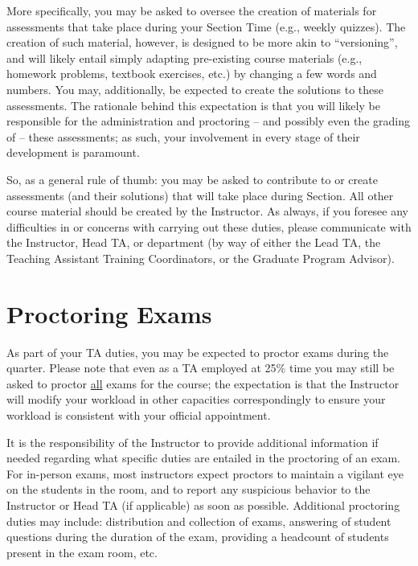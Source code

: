 \documentclass[
  letterpaper,
  DIV=11,
  numbers=noendperiod]{scrreprt}
\begin{document}
More specifically, you may be asked to oversee the creation of materials
for assessments that take place during your Section Time (e.g., weekly
quizzes). The creation of such material, however, is designed to be more
akin to ``versioning'', and will likely entail simply adapting
pre-existing course materials (e.g., homework problems, textbook
exercises, etc.) by changing a few words and numbers. You may,
additionally, be expected to create the solutions to these assessments.
The rationale behind this expectation is that you will likely be
responsible for the administration and proctoring -- and possibly even
the grading of -- these assessments; as such, your involvement in every
stage of their development is paramount.

So, as a general rule of thumb: you may be asked to contribute to or
create assessments (and their solutions) that will take place during
Section. All other course material should be created by the Instructor.
As always, if you foresee any difficulties in or concerns with carrying
out these duties, please communicate with the Instructor, Head TA, or
department (by way of either the Lead TA, the Teaching Assistant
Training Coordinators, or the Graduate Program Advisor).

\hypertarget{proctoring-exams}{%
\chapter{Proctoring Exams}\label{proctoring-exams}}

As part of your TA duties, you may be expected to proctor exams during
the quarter. Please note that even as a TA employed at 25\% time you may
still be asked to proctor \ul{all} exams for the course; the expectation
is that the Instructor will modify your workload in other capacities
correspondingly to ensure your workload is consistent with your official
appointment.

It is the responsibility of the Instructor to provide additional
information if needed regarding what specific duties are entailed in the
proctoring of an exam. For in-person exams, most instructors expect
proctors to maintain a vigilant eye on the students in the room, and to
report any suspicious behavior to the Instructor or Head TA (if
applicable) as soon as possible. Additional proctoring duties may
include: distribution and collection of exams, answering of student
questions during the duration of the exam, providing a headcount of
students present in the exam room, etc.
\end{document}
